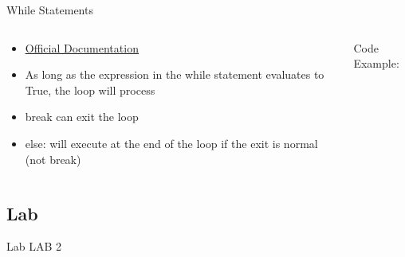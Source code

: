 % 
% 
% 
\begin{Slide}{While Statements}
  \begin{columns}
    \begin{column}{.48\textwidth}
      
      \begin{itemize}
      \item \underline{\href{https://docs.python.org/3/reference/compound_stmts.html\#the-while-statement}{Official Documentation}}
      \item As long as the expression in the while statement evaluates to True, the loop will process
      \item break can exit the loop 
      \item else: will execute at the end of the loop if the exit is normal (not break)
      \end{itemize}
      
      
    \end{column}

    \hfill

    \begin{column}{.48\textwidth}
      Code Example:
      

    \inputminted[firstline=3,
      lastline=22,
      breaklines,
      fontsize=\tiny,
      bgcolor=Background,
      linenos]{python}{../src/whileexample.py}

      
      
    \end{column}
  \end{columns}
\end{Slide}




\subsection{Lab}
\begin{Slide}{Lab}
  LAB 2
\end{Slide}

